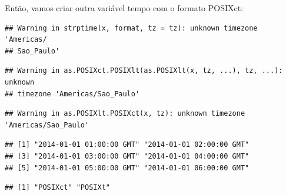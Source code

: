 \documentclass[]{book}
\newenvironment{Shaded}{\begin{snugshade}}{\end{snugshade}}
\newcommand{\KeywordTok}[1]{\textcolor[rgb]{0.13,0.29,0.53}{\textbf{#1}}}
\newcommand{\DataTypeTok}[1]{\textcolor[rgb]{0.13,0.29,0.53}{#1}}
\newcommand{\StringTok}[1]{\textcolor[rgb]{0.31,0.60,0.02}{#1}}
\newcommand{\OperatorTok}[1]{\textcolor[rgb]{0.81,0.36,0.00}{\textbf{#1}}}
\newcommand{\NormalTok}[1]{#1}
\theoremstyle{definition}
\theoremstyle{definition}
\theoremstyle{definition}
\theoremstyle{remark}
\begin{document}
Então, vamos criar outra variável tempo com o formato POSIXct:

\begin{Shaded}
\end{Shaded}

\begin{verbatim}
## Warning in strptime(x, format, tz = tz): unknown timezone 'Americas/
## Sao_Paulo'
\end{verbatim}

\begin{verbatim}
## Warning in as.POSIXct.POSIXlt(as.POSIXlt(x, tz, ...), tz, ...): unknown
## timezone 'Americas/Sao_Paulo'
\end{verbatim}

\begin{Shaded}
\end{Shaded}

\begin{verbatim}
## Warning in as.POSIXlt.POSIXct(x, tz): unknown timezone 'Americas/Sao_Paulo'
\end{verbatim}

\begin{verbatim}
## [1] "2014-01-01 01:00:00 GMT" "2014-01-01 02:00:00 GMT"
## [3] "2014-01-01 03:00:00 GMT" "2014-01-01 04:00:00 GMT"
## [5] "2014-01-01 05:00:00 GMT" "2014-01-01 06:00:00 GMT"
\end{verbatim}

\begin{Shaded}
\end{Shaded}

\begin{verbatim}
## [1] "POSIXct" "POSIXt"
\end{verbatim}
\end{document}
